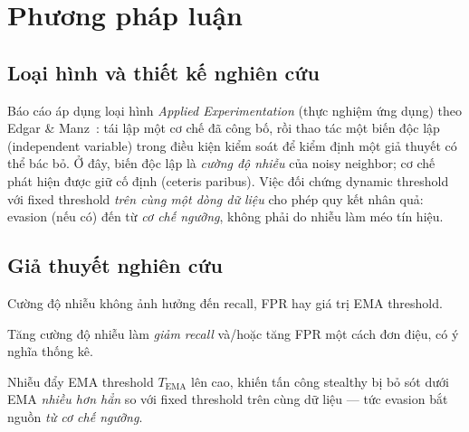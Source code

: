 \section{Phương pháp luận}\label{sec:method}

\subsection{Loại hình và thiết kế nghiên cứu}
Báo cáo áp dụng loại hình \textit{Applied Experimentation} (thực nghiệm ứng dụng) theo Edgar \& Manz~\cite{edgarmanz2017}: tái lập một cơ chế đã công bố, rồi thao tác một biến độc lập (independent variable) trong điều kiện kiểm soát để kiểm định một giả thuyết có thể bác bỏ. Ở đây, biến độc lập là \textit{cường độ nhiễu} của noisy neighbor; cơ chế phát hiện được giữ cố định (ceteris paribus). Việc đối chứng dynamic threshold với fixed threshold \textit{trên cùng một dòng dữ liệu} cho phép quy kết nhân quả: evasion (nếu có) đến từ \textit{cơ chế ngưỡng}, không phải do nhiễu làm méo tín hiệu.

\subsection{Giả thuyết nghiên cứu}
\begin{description}[leftmargin=1.2cm,style=nextline]
\item[H0] Cường độ nhiễu không ảnh hưởng đến recall, FPR hay giá trị EMA threshold.
\item[H1a] Tăng cường độ nhiễu làm \textit{giảm recall} và/hoặc tăng FPR một cách đơn điệu, có ý nghĩa thống kê.
\item[H1b] Nhiễu đẩy EMA threshold $T_{\text{EMA}}$ lên cao, khiến tấn công stealthy bị bỏ sót dưới EMA \textit{nhiều hơn hẳn} so với fixed threshold trên cùng dữ liệu — tức evasion bắt nguồn \textit{từ cơ chế ngưỡng}.
\end{description}

